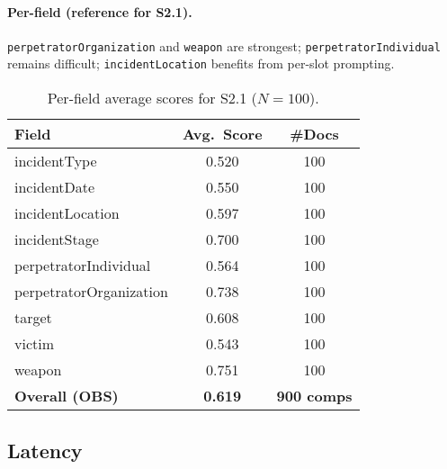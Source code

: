 \paragraph{Per-field (reference for S2.1).}
\texttt{perpetratorOrganization} and \texttt{weapon} are strongest; \texttt{perpetratorIndividual} remains difficult; \texttt{incidentLocation} benefits from per-slot prompting.

\begin{table}[H]
    \centering
    \caption{Per-field average scores for S2.1 ($N{=}100$).}
    \label{tab:s2-perfield}
    \begin{tabular}{lcc}
        \toprule
        Field & Avg.\ Score & \#Docs \\
        \midrule
        incidentType & 0.520 & 100 \\
        incidentDate & 0.550 & 100 \\
        incidentLocation & 0.597 & 100 \\
        incidentStage & 0.700 & 100 \\
        perpetratorIndividual & 0.564 & 100 \\
        perpetratorOrganization & 0.738 & 100 \\
        target & 0.608 & 100 \\
        victim & 0.543 & 100 \\
        weapon & 0.751 & 100 \\
        \midrule
        \textbf{Overall (OBS)} & \textbf{0.619} & \textbf{900 comps} \\
        \bottomrule
    \end{tabular}
\end{table}

\subsection*{Latency}

